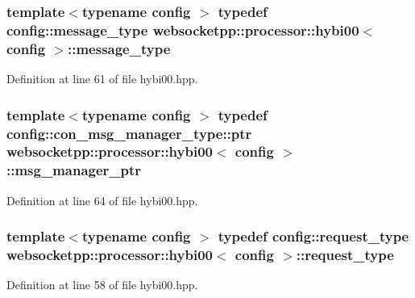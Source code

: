 \subsubsection[{message\+\_\+type}]{\setlength{\rightskip}{0pt plus 5cm}template$<$typename config $>$ typedef config\+::message\+\_\+type {\bf websocketpp\+::processor\+::hybi00}$<$ config $>$\+::{\bf message\+\_\+type}}\label{classwebsocketpp_1_1processor_1_1hybi00_a68b8a926b9fc5fcd296cb698920280ab}


Definition at line 61 of file hybi00.\+hpp.

\hypertarget{classwebsocketpp_1_1processor_1_1hybi00_aa33fb6bfdb3c905f267ba7d0c48b192e}{}
\subsubsection[{msg\+\_\+manager\+\_\+ptr}]{\setlength{\rightskip}{0pt plus 5cm}template$<$typename config $>$ typedef config\+::con\+\_\+msg\+\_\+manager\+\_\+type\+::ptr {\bf websocketpp\+::processor\+::hybi00}$<$ config $>$\+::{\bf msg\+\_\+manager\+\_\+ptr}}\label{classwebsocketpp_1_1processor_1_1hybi00_aa33fb6bfdb3c905f267ba7d0c48b192e}


Definition at line 64 of file hybi00.\+hpp.

\hypertarget{classwebsocketpp_1_1processor_1_1hybi00_a9992ac4efa9cc4d46ee0e9e1060cf860}{}
\subsubsection[{request\+\_\+type}]{\setlength{\rightskip}{0pt plus 5cm}template$<$typename config $>$ typedef config\+::request\+\_\+type {\bf websocketpp\+::processor\+::hybi00}$<$ config $>$\+::{\bf request\+\_\+type}}\label{classwebsocketpp_1_1processor_1_1hybi00_a9992ac4efa9cc4d46ee0e9e1060cf860}


Definition at line 58 of file hybi00.\+hpp.

\hypertarget{classwebsocketpp_1_1processor_1_1hybi00_abef7fc8290a6d30e086c639d5e0b393d}{}

